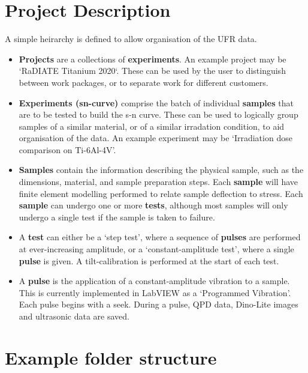 \documentclass{article}
\begin{document}
\section*{Project Description}

A simple heirarchy is defined to allow organisation of the UFR data.


\begin{itemize}
  \item{
    \textbf{Projects} are a collections of \textbf{experiments}.
    An example project may be `RaDIATE Titanium 2020`.
    These can be used by the user to distinguish between work packages, or to separate work for different customers.
  }
  \item{
    \textbf{Experiments (sn-curve)} comprise the batch of individual \textbf{samples} that are to be tested to build the s-n curve.
    These can be used to logically group samples of a similar material, or of a similar irradation condition, to aid organisation of the data.
    An example experiment may be `Irradiation dose comparison on Ti-6Al-4V'.
  }
  \item{
    \textbf{Samples} contain the information describing the physical sample, such as the dimensions, material, and sample preparation steps.
    Each \textbf{sample} will have finite element modelling performed to relate sample deflection to stress.
    Each \textbf{sample} can undergo one or more \textbf{tests}, although most samples will only undergo a single test if the sample is taken to failure.
  }
  \item{
    A \textbf{test} can either be a `step test', where a sequence of \textbf{pulses} are performed at ever-increasing amplitude, or a `constant-amplitude test', where a single \textbf{pulse} is given.
    A tilt-calibration is performed at the start of each test.
  }
  \item{
    A \textbf{pulse} is the application of a constant-amplitude vibration to a sample.
    This is currently implemented in LabVIEW as a `Programmed Vibration'.
    Each pulse begins with a seek.
    During a pulse, QPD data, Dino-Lite images and ultrasonic data are saved. 
  }  
\end{itemize}

\newpage

\section*{Example folder structure}

\end{document}
